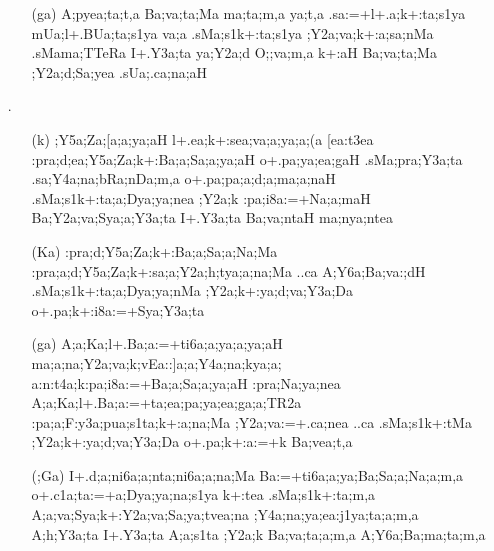 \begin{spacing}{1.15}
\begin{itemize} 
\item[] \begin{itemize}
          \item[({\sktf ga})] {\sktf A;pyea;ta;t,a Ba;va;ta;Ma ma;ta;m,a\ZF{,}
ya;t,a .sa:=+l+.a;k+:ta;s1ya mUa;l+.BUa;ta;s1ya
va;a .sMa;s1k+:ta;s1ya ;Y2a;va;k+:a;sa;nMa {.sMa}{ma;TTeRa}
I+.Y3a;ta  ya;Y2a;d O;;va;m,a\ZF{,} k+:aH Ba;va;ta;Ma
;Y2a;d;Sa;yea .sUa;.ca;na;aH }
          \end{itemize}                                         
          
\item[{\sktf 8}.]  \begin{itemize}
   \item[({\sktf k})] {\sktf ;Y5a;Za;[a;a;ya;aH
l+.ea;k+:sea;va;a;ya;a;(a [ea:t3ea\ZF{,}
:pra;d;ea;Y5a;Za;k+:Ba;a;Sa;a;ya;aH o+.pa;ya;ea;gaH
.sMa;pra;Y3a;ta .sa;Y4a;na;bRa;nDa;m,a o+.pa;pa;a;d;a;ma;a;naH%
\ZF{,} .sMa;s1k+:ta;a;Dya;ya;nea ;Y2a;k
:pa;i8a:=+Na;a;maH Ba;Y2a;va;Sya;a;Y3a;ta I+.Y3a;ta Ba;va;ntaH
ma;nya;ntea }  
              
   \item[({\sktf Ka})] {\sktf :pra;d;Y5a;Za;k+:Ba;a;Sa;a;Na;Ma
:pra;a;d;Y5a;Za;k+:sa;a;Y2a;h;tya;a;na;Ma ..ca
A;Y6a;Ba;va:;dH
.sMa;s1k+:ta;a\ZF{-};Dya;ya;nMa ;Y2a;k+:ya;d;va;Y3a;Da
o+.pa;k+:i8a:=+Sya;Y3a;ta  }
              
   \item[({\sktf ga})] {\sktf A;a;Ka;l+.Ba;a:=+ti6a;a;ya;a;ya;aH%
 ma;a;na;Y2a;va;k\ZF{-};vEa::]a;a;Y4a;na;k\ZF{-}ya;a;%
a:n:t4a;k\ZF{-}:pa;i8a:=+Ba;a;Sa;a;ya;aH
:pra;Na;ya;nea\ZF{,} A;a;Ka;l+.Ba;a:=+ta;ea;pa;ya;ea;ga;a;TR2a
:pa;a;F:y3a;pua;s1ta;k+:a;na;Ma ;Y2a;va:=+.ca;nea ..ca\ZF{,}
.sMa;s1k+:tMa ;Y2a;k+:ya;d;va;Y3a;Da
o+.pa;k+:a:=+k Ba;vea;t,a  } 
              
   \item[({\sktf ;Ga})] {\sktf I+.d;a;ni6a;a;nta;ni6a;a;na;Ma
Ba:=+ti6a;a;ya;Ba;Sa;a;Na;a;m,a o+.c1a;ta:=+a;Dya;ya;na;s1ya
k+:tea .sMa;s1k+:ta;m,a
A;a;va;Sya;k+:Y2a;va;Sa;ya;tvea;na ;Y4a;na;ya;ea:j1ya;ta;a;m,a
A;h;Y3a;ta\ZF{,} I+.Y3a;ta A;a;s1ta
;Y2a;k Ba;va;ta;a;m,a A;Y6a;Ba;ma;ta;m,a }
                            

\end{itemize}
\end{itemize}
\end{spacing}
